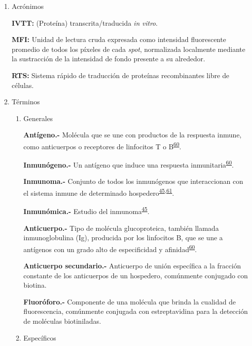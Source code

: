 \documentclass[a4paper]{article}
\begin{document}
\begin{enumerate}
\def\labelenumi{\alph{enumi}.}
\item
  Acrónimos

  \textbf{IVTT:} (Proteína) transcrita/traducida \emph{in vitro}.

  \textbf{MFI:} Unidad de lectura cruda expresada como intensidad
  fluorescente promedio de todos los píxeles de cada \emph{spot},
  normalizada localmente mediante la sustracción de la intensidad de
  fondo presente a su alrededor.

  \textbf{RTS:} Sistema rápido de traducción de proteínas recombinantes
  libre de células.
\item
  Términos

  \begin{enumerate}
  \def\labelenumii{\roman{enumii}.}
  \item
    Generales

    \textbf{Antígeno.-} Molécula que se une con productos de la
    respuesta inmune, como anticuerpos o receptores de linfocitos T o
    B\textsuperscript{\protect\hyperlink{ref-abbas2012}{60}}.

    \textbf{Inmunógeno.-} Un antígeno que induce una respuesta
    inmunitaria\textsuperscript{\protect\hyperlink{ref-abbas2012}{60}}.

    \textbf{Inmunoma.-} Conjunto de todos los inmunógenos que
    interaccionan con el sistema inmune de determinado
    hospedero\textsuperscript{\protect\hyperlink{ref-immunomics2016}{45},\protect\hyperlink{ref-sette2005}{61}}.

    \textbf{Inmunómica.-} Estudio del
    inmunoma\textsuperscript{\protect\hyperlink{ref-immunomics2016}{45}}.

    \textbf{Anticuerpo.-} Tipo de molécula glucoproteica, también
    llamada inmunoglobulina (Ig), producida por los linfocitos B, que se
    une a antígenos con un grado alto de especificidad y
    afinidad\textsuperscript{\protect\hyperlink{ref-abbas2012}{60}}.

    \textbf{Anticuerpo secundario.-} Anticuerpo de unión específica a la
    fracción constante de los anticuerpos de un hospedero, comúnmente
    conjugado con biotina.

    \textbf{Fluoróforo.-} Componente de una molécula que brinda la
    cualidad de fluorescencia, comúnmente conjugada con estreptavidina
    para la detección de moléculas biotiniladas.
  \item
    Específicos


\end{enumerate}
\end{enumerate}
\end{document}
